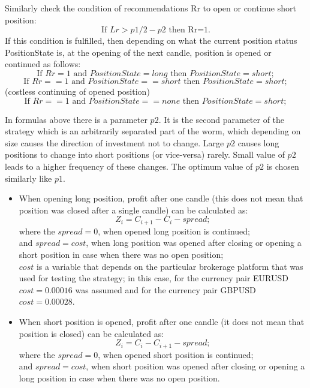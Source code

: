 \documentclass[runningheads,a4paper]{llncs}
\begin{document}
Similarly check the condition of recommendations Rr to open or continue short position:
\begin{equation}
\text{If } Lr>p1/2 - p2 \text { then Rr=1.}
\end{equation}
If this condition is fulfilled, then depending on what the current position status PositionState is, at the opening of the next candle, position is opened or continued as follows: \\
\begin{equation}
\text{If } Rr=1 \text{ and } PositionState =long \text{ then } PositionState =short;
\end{equation}
\begin{equation}
\text{If } Rr==1 \text{ and } PositionState ==short \text{ then } PositionState=short;
\end{equation}
(costless continuing of opened position)
\begin{equation}
\text{If } Rr==1 \text{ and }  PositionState ==none \text{ then }  PositionState =short;
\end{equation}

In formulas above there is a parameter $p2$. It is the second parameter of the strategy which is an arbitrarily separated part of the worm, which depending on size causes the direction of investment not to change. Large $p2$ causes long positions to change into short positions (or vice-versa) rarely. Small value of $p2$ leads to a higher frequency of these changes. The optimum value of $p2$ is chosen similarly like $p1$.
\begin{itemize}
\item 	When opening long position, profit after one candle (this does not mean that position was closed after a single candle) can be calculated as:
\begin{equation}
Z_i = C_{i+1} - C_i - spread;
\end{equation}
where the $spread = 0$, when opened long position is continued; \\
and $spread = cost$, when long position was opened after closing or opening a short position in case when there was no open position;\\
$cost$ is a variable that depends on the particular brokerage platform that was used for testing the strategy; in this case, for the currency pair EURUSD $cost = 0.00016$ was assumed and for the currency pair GBPUSD $cost = 0.00028$.
\item When short position is opened, profit after one candle (it does not mean that position is closed) can be calculated as: 
\begin{equation}
Z_i = C_i-C_{i+1}- spread;
\end{equation}
where the $spread = 0$, when opened short position is continued;\\ 
and $spread = cost$, when short position was opened after closing or opening a long position in case when there was no open position.
\end{itemize}
\end{document}
